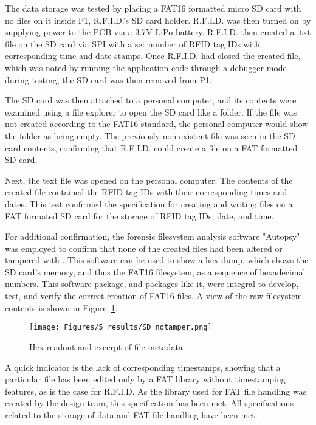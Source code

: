 The data storage was tested by placing a FAT16 formatted micro SD card with no files on it inside P1, R.F.I.D.'s SD card holder. R.F.I.D. was then turned on by supplying power to the PCB via a 3.7V LiPo battery. R.F.I.D. then created a .txt file on the SD card via SPI with a set number of RFID tag IDs with corresponding time and date stamps. Once R.F.I.D. had closed the created file, which was noted by running the application code through a debugger mode during testing, the SD card was then removed from P1.

The SD card was then \DIFdelbegin {}\DIFdelend attached to a personal computer, and its contents were examined using a file explorer to open the SD card like a folder. If the file was not created according to the FAT16 standard, the personal computer would show the folder as being empty. The previously non-existent file was seen in the SD card contents, confirming that R.F.I.D. could create a file on a FAT formatted SD card. 

Next, the text file was opened on the personal computer. The contents of the created file contained the RFID tag IDs with their corresponding times and dates. This test confirmed the specification for creating and writing files on a FAT formated SD card for the storage of RFID tag IDs, date, and time. 

For additional confirmation, the forensic filesystem analysis software "Autopsy" was employed to confirm that none of the created files had been altered or tampered with \cite{src_autopsy}. This software can be used to show a hex dump, which shows the SD card's memory, and thus the FAT16 filesystem, as a sequence of hexadecimal numbers. This software package, and packages like it, were integral to develop, test, and verify the correct creation of FAT16 files. A view of the raw filesystem contents is shown in Figure~\ref{fig:notamper}. 





\begin{figure}[H]
    \centering
    \texttt{[image: Figures/5\_results/SD\_notamper.png]} 
    \caption{Hex readout and excerpt of file metadata.}
    \label{fig:notamper}
\end{figure}

A quick indicator is the lack of corresponding timestamps, showing that a particular file has been edited only by a FAT library without timestamping features, as is the case for R.F.I.D. As the library used for FAT file handling was created by the design team, this specification has been met. All specifications related to the storage of data and FAT file handling have been met.

